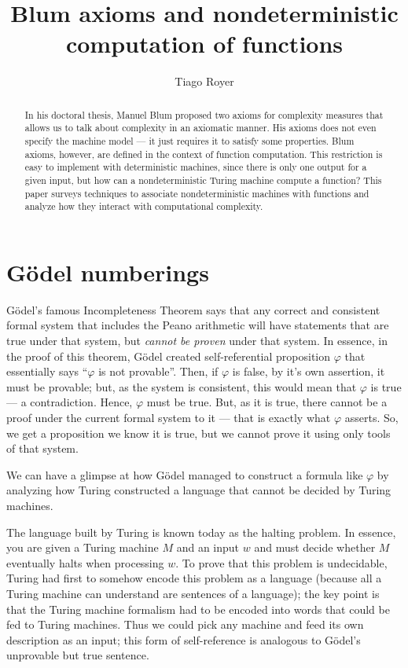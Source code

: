 \documentclass[12pt]{article}
\title{Blum axioms and nondeterministic computation of functions}
\author{Tiago Royer\inst{1}}
\theoremstyle{definition}
\begin{document}
\maketitle

\begin{abstract}
    In his doctoral thesis,
    Manuel Blum proposed two axioms for complexity measures
    that allows us to talk about complexity in an axiomatic manner.
    His axioms does not even specify the machine model
    --- it just requires it to satisfy some properties.
    Blum axioms, however,
    are defined in the context of function computation.
    This restriction is easy to implement with deterministic machines,
    since there is only one output for a given input,
    but how can a nondeterministic Turing machine compute a function?
    This paper surveys techniques to associate
    nondeterministic machines with functions
    and analyze how they interact with computational complexity.
\end{abstract}

\section{Gödel numberings}


Gödel's famous Incompleteness Theorem says that
any correct and consistent formal system that includes the Peano arithmetic
will have statements that are true under that system,
but \emph{cannot be proven} under that system.
In essence,
in the proof of this theorem,
Gödel created self-referential proposition $\varphi$
that essentially says ``$\varphi$ is not provable''.
Then, if $\varphi$ is false,
by it's own assertion, it must be provable;
but, as the system is consistent,
this would mean that $\varphi$ is true
--- a contradiction.
Hence, $\varphi$ must be true.
But, as it is true,
there cannot be a proof under the current formal system to it
--- that is exactly what $\varphi$ asserts.
So,
we get a proposition we know it is true,
but we cannot prove it using only tools of that system.

We can have a glimpse at how Gödel managed to construct a formula like $\varphi$
by analyzing how Turing constructed a language
that cannot be decided by Turing machines.

The language built by Turing is known today as the halting problem.
In essence,
you are given a Turing machine $M$ and an input $w$
and must decide whether $M$ eventually halts when processing $w$.
To prove that this problem is undecidable,
Turing had first to somehow encode this problem as a language
(because all a Turing machine can understand are sentences of a language);
the key point is that the Turing machine formalism
had to be encoded into words that could be fed to Turing machines.
Thus we could pick any machine and feed its own description as an input;
this form of self-reference is analogous
to Gödel's unprovable but true sentence.
\end{document}
